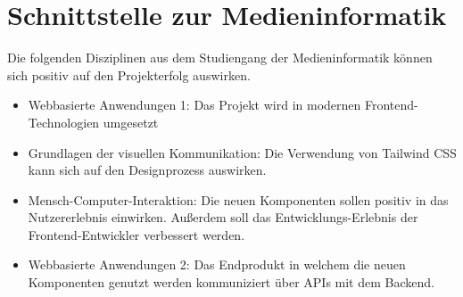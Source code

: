 \chapter{Schnittstelle zur Medieninformatik}
\label{cha:Schnittstelle zur Medieninformatik}

Die folgenden Disziplinen aus dem Studiengang der Medieninformatik können sich positiv auf den Projekterfolg auswirken.

\begin{itemize}
  \item Webbasierte Anwendungen 1: Das Projekt wird in modernen Frontend-Technologien umgesetzt
  \item Grundlagen der visuellen Kommunikation: Die Verwendung von Tailwind CSS kann sich auf den Designprozess auswirken.
  \item Mensch-Computer-Interaktion: Die neuen Komponenten sollen positiv in das Nutzererlebnis einwirken. Außerdem soll das Entwicklungs-Erlebnis der Frontend-Entwickler verbessert werden.  
  \item Webbasierte Anwendungen 2: Das Endprodukt in welchem die neuen Komponenten genutzt werden kommuniziert über APIs mit dem Backend.
\end{itemize}
